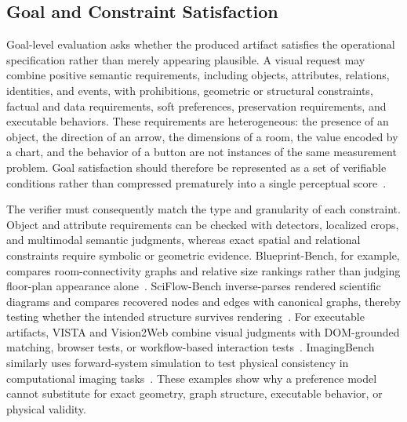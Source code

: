 \subsection{Goal and Constraint Satisfaction}
\label{subsec:goal-satisfaction}

Goal-level evaluation asks whether the produced artifact satisfies the operational specification rather than merely appearing plausible. A visual request may combine positive semantic requirements, including objects, attributes, relations, identities, and events, with prohibitions, geometric or structural constraints, factual and data requirements, soft preferences, preservation requirements, and executable behaviors. These requirements are heterogeneous: the presence of an object, the direction of an arrow, the dimensions of a room, the value encoded by a chart, and the behavior of a button are not instances of the same measurement problem. Goal satisfaction should therefore be represented as a set of verifiable conditions rather than compressed prematurely into a single perceptual score~\cite{avg260329139,avg250913399,avg260707189,avg260526144,avg250925229,avg260209809}.

The verifier must consequently match the type and granularity of each constraint. Object and attribute requirements can be checked with detectors, localized crops, and multimodal semantic judgments, whereas exact spatial and relational constraints require symbolic or geometric evidence. Blueprint-Bench, for example, compares room-connectivity graphs and relative size rankings rather than judging floor-plan appearance alone~\cite{avg250925229}. SciFlow-Bench inverse-parses rendered scientific diagrams and compares recovered nodes and edges with canonical graphs, thereby testing whether the intended structure survives rendering~\cite{avg260209809}. For executable artifacts, VISTA and Vision2Web combine visual judgments with DOM-grounded matching, browser tests, or workflow-based interaction tests~\cite{avg260526144,avg260326648}. ImagingBench similarly uses forward-system simulation to test physical consistency in computational imaging tasks~\cite{avg260707189}. These examples show why a preference model cannot substitute for exact geometry, graph structure, executable behavior, or physical validity.

